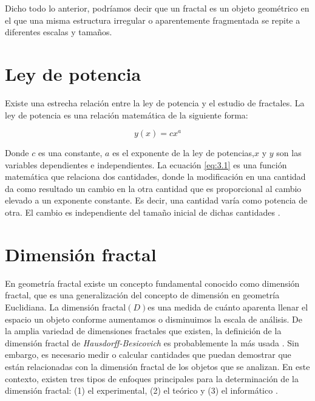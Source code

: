 Dicho todo lo anterior, podr\'{i}amos decir que un fractal es un objeto geom\'{e}trico en el que una misma estructura irregular o aparentemente fragmentada se repite a diferentes escalas y tamaños. 

\section{Ley de potencia} 

Existe una estrecha relaci\'{o}n entre la ley de potencia y el estudio de fractales. La ley de potencia es una relaci\'{o}n matem\'{a}tica de la siguiente forma:

\begin{equation}
	y(x) = cx^{a}
	\label{eq:3.1}
\end{equation}

Donde $c$ es una constante, $a$ es el exponente de la ley de potencias,$x$ y $y$ son las variables dependientes e independientes. La ecuaci\'{o}n \ref{eq:3.1} es una funci\'{o}n matem\'{a}tica que relaciona dos cantidades, donde la modificación en una cantidad da como resultado un cambio en la otra cantidad que es proporcional al cambio elevado a un exponente constante. Es decir, una cantidad var\'{i}a como potencia de otra. El cambio es independiente del tamaño inicial de dichas cantidades \cite{Meakin1998}.

\color{blue}

\section{Dimensi\'{o}n fractal}

En geometr\'{i}a fractal existe un concepto fundamental conocido como dimensi\'{o}n fractal, que es una generalizaci\'{o}n del concepto de dimensi\'{o}n en geometr\'{i}a Euclidiana. La dimensi\'{o}n fractal$(D)$es una medida de cu\'{a}nto aparenta llenar el espacio un objeto conforme aumentamos o disminuimos la escala de an\'{a}lisis. De la  amplia variedad de dimensiones fractales que existen, la definici\'{o}n de la dimensi\'{o}n fractal de \textit{Hausdorff-Besicovich} es probablemente la m\'{a}s usada \cite{Vicsek1992, Meakin1998}. Sin embargo, es necesario medir o calcular cantidades que puedan demostrar que est\'{a}n relacionadas con la dimensi\'{o}n fractal de los objetos que se analizan. En este contexto, existen  tres tipos de enfoques principales para la determinaci\'{o}n de la dimensi\'{o}n fractal: (1) el experimental, (2) el te\'{o}rico y (3) el inform\'{a}tico \cite{Vicsek1992}.

